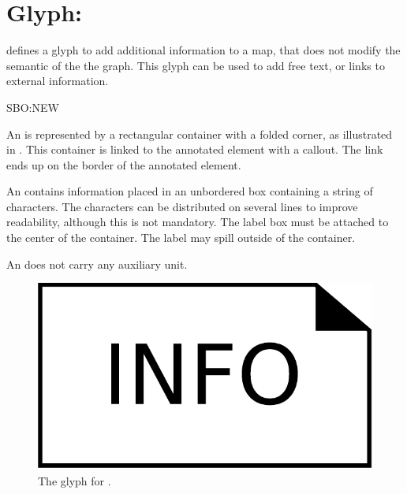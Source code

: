 
\section{Glyph: }
\label{sec:annotation}

\SBGNAFLone defines a glyph to add additional information to a map, that does not modify the semantic of the the graph. This glyph can be used to add free text, or links to external information.

\begin{glyphDescription}

\glyphSboTerm SBO:NEW

\glyphContainer An  is represented by a rectangular container with a folded corner, as illustrated in . This container is linked to the annotated element with a callout. The link ends up on the border of the annotated element.

\glyphLabel An  contains information placed in an unbordered box containing a string of characters.  The characters can be distributed on several lines to improve readability, although this is not mandatory.  The label box must be attached to the center of the container. The label may spill outside of the container. 

\glyphAux An  does not carry any auxiliary unit.
\end{glyphDescription}

\begin{figure}[H]
  \centering
  \includegraphics[scale = 0.3]{images/annotation}
  \caption{The \ER glyph for .}
  \label{fig:annotation}
\end{figure}


